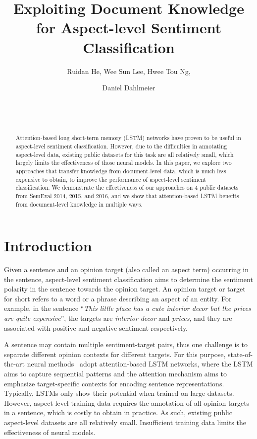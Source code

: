 \documentclass[11pt,a4paper]{article}
\title{Exploiting Document Knowledge \\ for Aspect-level Sentiment Classification}
\author{Ruidan He\affmark[\dag\ddag], Wee Sun Lee\affmark[\dag], Hwee Tou Ng\affmark[\dag], \and Daniel Dahlmeier\affmark[\ddag]\\
\affaddr{\affmark[\dag]Department of Computer Science, National University of Singapore}\\
\affaddr{\affmark[\ddag]SAP Innovation Center Singapore}\\
\email{\affmark[\dag]\{ruidanhe,leews,nght\}@comp.nus.edu.sg}\\
\email{\affmark[\ddag]d.dahlmeier@sap.com}}
\date{}
\begin{document}
\maketitle
\begin{abstract}

Attention-based long short-term memory (LSTM) networks have proven to be useful in aspect-level sentiment classification. However, due to the difficulties in annotating aspect-level data, existing public datasets for this task are all relatively small, which largely limits the effectiveness of those neural models. 
In this paper, we explore two approaches that transfer knowledge from document-level data, which is much less expensive to obtain, to improve the performance of aspect-level sentiment classification. We demonstrate the effectiveness of our approaches on 4 public datasets from SemEval 2014, 2015, and 2016, and we show that attention-based LSTM benefits from document-level knowledge in multiple ways.
\end{abstract}


\section{Introduction}

Given a sentence and an opinion target (also called an aspect term) occurring in the sentence, aspect-level sentiment classification aims to determine the sentiment polarity in the sentence towards the opinion target. An opinion target or target for short refers to a word or a phrase describing an aspect of an entity. For example, in the sentence ``\emph{This little place has a cute interior decor but the prices are quite expensive}'', the targets are \emph{interior decor} and \emph{prices}, and they are associated with positive and negative sentiment respectively.

A sentence may contain multiple sentiment-target pairs, thus one challenge is to separate different opinion contexts for different targets. For this purpose, state-of-the-art neural methods~\cite{Wang:16,Liu:17,Chen:17} adopt attention-based LSTM networks, where the LSTM aims to capture sequential patterns and the attention mechanism aims to emphasize target-specific contexts for encoding sentence representations. Typically, LSTMs only show their potential when trained on large datasets. However, aspect-level training data requires the annotation of all opinion targets in a sentence, which is costly to obtain in practice. As such, existing public aspect-level datasets are all relatively small. Insufficient training data limits the effectiveness of neural models.  
\end{document}
